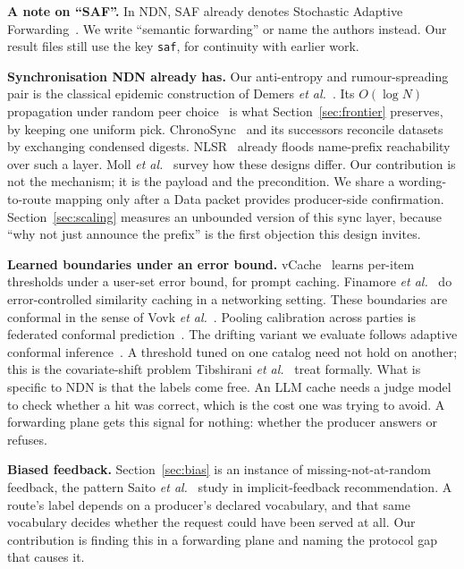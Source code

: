 \documentclass[conference]{IEEEtran}
\begin{document}
		\textbf{A note on ``SAF''.} In NDN, SAF already denotes Stochastic Adaptive
		Forwarding~\cite{posch2017saf}. We write ``semantic forwarding'' or name the
		authors instead. Our result files still use the key \texttt{saf}, for
		continuity with earlier work.
		
		\textbf{Synchronisation NDN already has.} Our anti-entropy and
		rumour-spreading pair is the classical epidemic construction of Demers
		\emph{et al.}~\cite{demers1987epidemic}. Its $O(\log N)$ propagation under
		random peer choice~\cite{karp2000rumor} is what Section~\ref{sec:frontier}
		preserves, by keeping one uniform pick. ChronoSync~\cite{zhu2013chronosync}
		and its successors reconcile datasets by exchanging condensed digests.
		NLSR~\cite{hoque2013nlsr} already floods name-prefix reachability over such a
		layer. Moll \emph{et al.}~\cite{moll2022sok} survey how these designs differ.
		Our contribution is not the mechanism; it is the payload and the
		precondition. We share a wording-to-route mapping only after a Data packet
		provides producer-side confirmation. Section~\ref{sec:scaling} measures an unbounded version of
		this sync layer, because ``why not just announce the prefix'' is the first
		objection this design invites.
		
		\textbf{Learned boundaries under an error bound.}
		vCache~\cite{schroeder2025vcache} learns per-item thresholds under a
		user-set error bound, for prompt caching. Finamore \emph{et
			al.}~\cite{finamore2022approximatekey} do error-controlled similarity
		caching in a networking setting. These boundaries are conformal in the
		sense of Vovk \emph{et al.}~\cite{vovk2005alrw}. Pooling calibration across
		parties is federated conformal prediction~\cite{lu2023federated}. The
		drifting variant we evaluate follows adaptive conformal
		inference~\cite{gibbs2021aci}. A threshold tuned on one catalog need not
		hold on another; this is the covariate-shift problem Tibshirani \emph{et
			al.}~\cite{tibshirani2019covariate} treat formally. What is specific to
		NDN is that the labels come free. An LLM cache needs a judge model to check
		whether a hit was correct, which is the cost one was trying to avoid. A
		forwarding plane gets this signal for nothing: whether the producer answers
		or refuses.
		
		\textbf{Biased feedback.} Section~\ref{sec:bias} is an instance of
		missing-not-at-random feedback, the pattern Saito \emph{et
			al.}~\cite{saito2020unbiased} study in implicit-feedback recommendation. A
		route's label depends on a producer's declared vocabulary, and that same
		vocabulary decides whether the request could have been served at all. Our
		contribution is finding this in a forwarding plane and naming the protocol
		gap that causes it.
		
\end{document}
